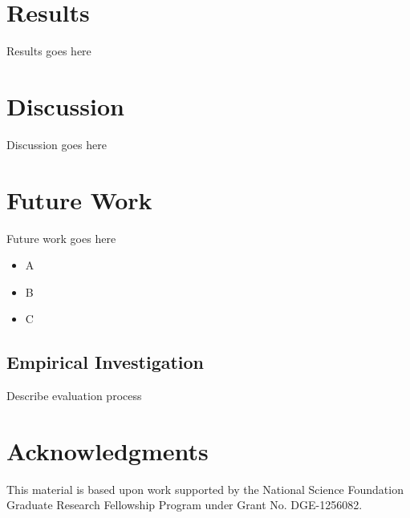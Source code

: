 \documentclass{sigchi}
\begin{document}
\section{Results}
Results goes here

\section{Discussion}
Discussion goes here

\section{Future Work}
Future work goes here
\begin{itemize}
\item A 
\item B
\item C

\end{itemize}

\subsection{Empirical Investigation}
Describe evaluation process

\section{Acknowledgments}

This material is based upon work supported by the National Science Foundation
Graduate Research Fellowship Program under Grant No. DGE-1256082.

%
%
%
%
%
\balance



\end{document}
